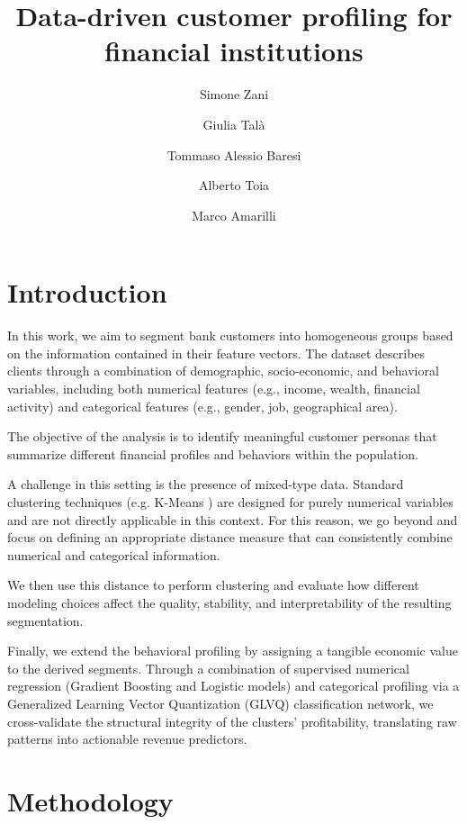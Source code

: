 \documentclass[9pt,a4paper,twocolumn,twoside]{rho-class/rho}
\title{Data-driven customer profiling for financial institutions}
\author[a]{Simone Zani}
\author[a]{Giulia Talà}
\author[a]{Tommaso Alessio Baresi}
\author[a]{Alberto Toia}
\author[a]{Marco Amarilli}
\affil[a]{Politecnico di Milano}
\begin{document}
\maketitle
\thispagestyle{firststyle}


\section{Introduction}

In this work, we aim to segment bank customers into homogeneous groups based on the information contained in their feature vectors. The dataset describes clients through a combination of demographic, socio-economic, and behavioral variables, including both numerical features (e.g., income, wealth, financial activity) and categorical features (e.g., gender, job, geographical area).

The objective of the analysis is to identify meaningful customer personas that summarize different financial profiles and behaviors within the population.

A challenge in this setting is the presence of mixed-type data. Standard clustering techniques (e.g. K-Means \cite{Ikotun2023}) are designed for purely numerical variables and are not directly applicable in this context. For this reason, we go beyond and focus on defining an appropriate distance measure that can consistently combine numerical and categorical information.

We then use this distance to perform clustering and evaluate how different modeling choices affect the quality, stability, and interpretability of the resulting segmentation.

Finally, we extend the behavioral profiling by assigning a tangible economic value to the derived segments. Through a combination of supervised numerical regression (Gradient Boosting and Logistic models) and categorical profiling via a Generalized Learning Vector Quantization (GLVQ) classification network, we cross-validate the structural integrity of the clusters' profitability, translating raw patterns into actionable revenue predictors.


\section{Methodology}
\end{document}
